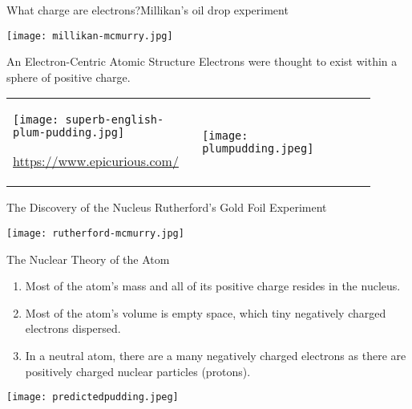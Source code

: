 \documentclass[notes=only]{beamer}
\begin{document}
\begin{frame}{What charge are electrons?}{Millikan's oil drop experiment}
	\begin{center}
		\texttt{[image: millikan-mcmurry.jpg]}
	\end{center}
\end{frame}

\begin{frame}{An Electron-Centric Atomic Structure}
	Electrons were thought to exist within a sphere of
	positive charge.

	\bigskip

	\begin{tabular} {m{0.45\linewidth}@{\qquad}m{0.45\linewidth}}
		\texttt{[image: superb-english-plum-pudding.jpg]}

		\tiny\url{https://www.epicurious.com/}
		& \texttt{[image: plumpudding.jpeg]} \\
	\end{tabular}
\end{frame}

\begin{frame}{The Discovery of the Nucleus}
	{Rutherford's Gold Foil Experiment}

	\begin{center}
		\texttt{[image: rutherford-mcmurry.jpg]}
	\end{center}
\end{frame}

\begin{frame}{The Nuclear Theory of the Atom}
	\begin{enumerate}
		\item Most of the atom's mass and all of its positive charge
			resides in the nucleus.
		\item Most of the atom's volume is empty space, which tiny
			negatively charged electrons dispersed.
		\item In a neutral atom, there are a many negatively charged
			electrons as there are positively charged nuclear
			particles (protons).
	\end{enumerate}

	\begin{center}
		\texttt{[image: predictedpudding.jpeg]}
	\end{center}
\end{frame}

\end{document}
